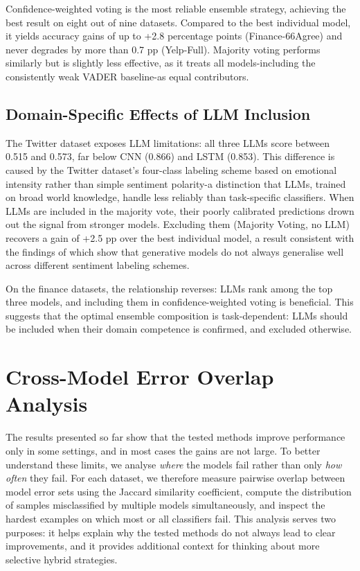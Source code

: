 \documentclass[conference]{IEEEtran}
\begin{document}
Confidence-weighted voting is the most reliable ensemble strategy, achieving the best result on eight out of nine datasets. Compared to the best individual model, it yields accuracy gains of up to +2.8 percentage points (Finance-66Agree) and never degrades by more than 0.7 pp (Yelp-Full). Majority voting performs similarly but is slightly less effective, as it treats all models-including the consistently weak VADER baseline-as equal contributors.

\subsection{Domain-Specific Effects of LLM Inclusion}

The Twitter dataset exposes LLM limitations: all three LLMs score between 0.515 and 0.573, far below CNN (0.866) and LSTM (0.853). This difference is caused by the Twitter dataset's four-class labeling scheme based on emotional intensity rather than simple sentiment polarity-a distinction that LLMs, trained on broad world knowledge, handle less reliably than task-specific classifiers. When LLMs are included in the majority vote, their poorly calibrated predictions drown out the signal from stronger models. Excluding them (Majority Voting, no LLM) recovers a gain of +2.5 pp over the best individual model, a result consistent with the findings of \cite{sa-in-age-of-genai} which show that generative models do not always generalise well across different sentiment labeling schemes.

On the finance datasets, the relationship reverses: LLMs rank among the top three models, and including them in confidence-weighted voting is beneficial. This suggests that the optimal ensemble composition is task-dependent: LLMs should be included when their domain competence is confirmed, and excluded otherwise.

\section{Cross-Model Error Overlap Analysis}
\label{sec:error_overlap}

The results presented so far show that the tested methods improve performance only in some settings, and in most cases the gains are not large. To better understand these limits, we analyse \emph{where} the models fail rather than only \emph{how often} they fail. For each dataset, we therefore measure pairwise overlap between model error sets using the Jaccard similarity coefficient, compute the distribution of samples misclassified by multiple models simultaneously, and inspect the hardest examples on which most or all classifiers fail. This analysis serves two purposes: it helps explain why the tested methods do not always lead to clear improvements, and it provides additional context for thinking about more selective hybrid strategies.
\end{document}
